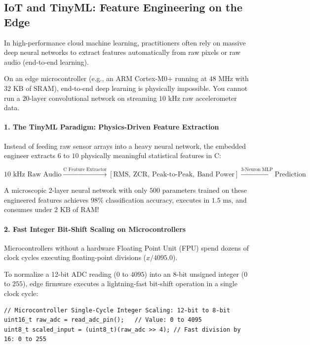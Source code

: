 \subsection{IoT and TinyML: Feature Engineering on the Edge}\label{subsec:feature_iot}

\begin{iotbox}
In high-performance cloud machine learning, practitioners often rely on massive deep neural networks to extract features automatically from raw pixels or raw audio (end-to-end learning). 

On an edge microcontroller (e.g., an ARM Cortex-M0+ running at $48\text{ MHz}$ with $32\text{ KB}$ of SRAM), end-to-end deep learning is physically impossible. You cannot run a $20\text{-layer}$ convolutional network on streaming $10\text{ kHz}$ raw accelerometer data.

\paragraph{1. The TinyML Paradigm: Physics-Driven Feature Extraction}
Instead of feeding raw sensor arrays into a heavy neural network, the embedded engineer extracts $6$ to $10$ physically meaningful statistical features in C:
\begin{center}
$10\text{ kHz Raw Audio} \xrightarrow{\text{C Feature Extractor}} [\text{RMS}, \ \text{ZCR}, \ \text{Peak-to-Peak}, \ \text{Band Power}] \xrightarrow{\text{3-Neuron MLP}} \text{Prediction}$
\end{center}
A microscopic 2-layer neural network with only $500$ parameters trained on these engineered features achieves $98\%$ classification accuracy, executes in $1.5\text{ ms}$, and consumes under $2\text{ KB}$ of RAM!

\paragraph{2. Fast Integer Bit-Shift Scaling on Microcontrollers}
Microcontrollers without a hardware Floating Point Unit (FPU) spend dozens of clock cycles executing floating-point divisions ($x / 4095.0$). 

To normalize a 12-bit ADC reading ($0$ to $4095$) into an 8-bit unsigned integer ($0$ to $255$), edge firmware executes a lightning-fast bit-shift operation in a single clock cycle:
\begin{lstlisting}[style=pythonstyle]
// Microcontroller Single-Cycle Integer Scaling: 12-bit to 8-bit
uint16_t raw_adc = read_adc_pin();   // Value: 0 to 4095
uint8_t scaled_input = (uint8_t)(raw_adc >> 4); // Fast division by 16: 0 to 255
\end{lstlisting}


\end{iotbox}
